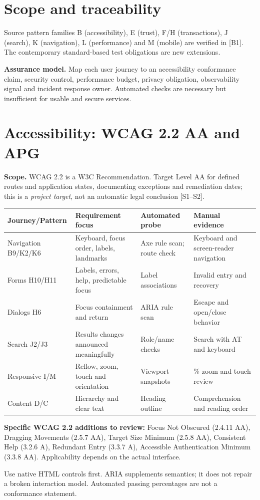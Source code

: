 \documentclass[11pt]{article}
\begin{document}
\MakeFront
\section{Scope and traceability}

\Provenance
\begin{groundedbox}Source pattern families B (accessibility), E (trust), F/H (transactions), J (search), K (navigation), L (performance) and M (mobile) are verified in [B1]. The contemporary standard-based test obligations are new extensions.\end{groundedbox}
\textbf{Assurance model.} Map each user journey to an accessibility conformance claim, security control, performance budget, privacy obligation, observability signal and incident response owner. Automated checks are necessary but insufficient for usable and secure services.

\section{Accessibility: WCAG 2.2 AA and APG}

\textbf{Scope.} WCAG 2.2 is a W3C Recommendation. Target Level AA for defined routes and application states, documenting exceptions and remediation dates; this is a \emph{project target}, not an automatic legal conclusion [S1--S2].\par
\noindent\begin{tabularx}{\linewidth}{@{}>{\raggedright\arraybackslash}p{30mm}>{\raggedright\arraybackslash}p{34mm}>{\raggedright\arraybackslash}X>{\raggedright\arraybackslash}X@{}}\toprule
Journey/Pattern & Requirement focus & Automated probe & Manual evidence\\\midrule
Navigation B9/K2/K6 & Keyboard, focus order, labels, landmarks & Axe rule scan; route check & Keyboard and screen-reader navigation\\
Forms H10/H11 & Labels, errors, help, predictable focus & Label associations & Invalid entry and recovery\\
Dialogs H6 & Focus containment and return & ARIA rule scan & Escape and open/close behavior\\
Search J2/J3 & Results changes announced meaningfully & Role/name checks & Search with AT and keyboard\\
Responsive I/M & Reflow, zoom, touch and orientation & Viewport snapshots & 400\% zoom and touch review\\
Content D/C & Hierarchy and clear text & Heading outline & Comprehension and reading order\\
\bottomrule\end{tabularx}
\textbf{Specific WCAG 2.2 additions to review:} Focus Not Obscured (2.4.11 AA), Dragging Movements (2.5.7 AA), Target Size Minimum (2.5.8 AA), Consistent Help (3.2.6 A), Redundant Entry (3.3.7 A), Accessible Authentication Minimum (3.3.8 AA). Applicability depends on the actual interface.
\begin{decisionbox}Use native HTML controls first. ARIA supplements semantics; it does not repair a broken interaction model. Automated passing percentages are not a conformance statement.\end{decisionbox}
\end{document}
